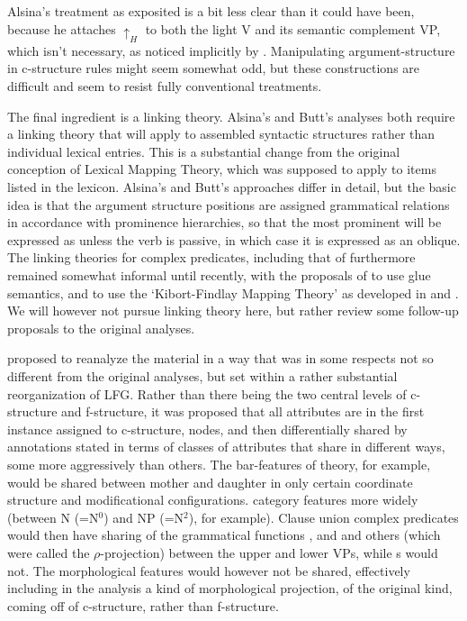 \documentclass[output=paper,hidelinks]{langscibook}
\begin{document}
Alsina’s treatment as exposited is a bit less clear than it could have been, because he attaches $\uparrow_H$ to both the light V and its semantic complement VP, which isn't necessary, as
noticed implicitly by \citet[241]{ButtKing2006}.  Manipulating
argument-structure in c-structure rules might seem somewhat odd, but these constructions
are difficult and seem to resist fully conventional treatments.

The final ingredient is a linking theory.  Alsina's and Butt's analyses both
require a linking theory that will apply to assembled syntactic structures rather
than individual lexical entries.  This is a substantial change from the original
conception of Lexical Mapping Theory, which was supposed to apply to items listed
in the lexicon.  Alsina's and Butt's approaches differ in
detail, but the basic idea is that the argument structure positions are assigned
grammatical relations in accordance with prominence hierarchies, so that the
most prominent will be expressed as {\SUBJ} unless the verb is passive, in which
case it is expressed as an oblique.
The linking theories for complex predicates, including that of
\citet{AndrewsManning1999} furthermore remained somewhat informal until recently,
with the proposals of \citet{Lowe2015} to use glue semantics, and
\citet{Andrews2018shs} to use the `Kibort-Findlay Mapping Theory' as developed in
\citet{asudeh2014meaning} and \citet{findlay2017mapping}.  We will however
not pursue linking theory here, but rather review some follow-up proposals to
the original analyses.

\citet{AndrewsManning1999} proposed to reanalyze the material in a way that was
in some respects not so different from the original analyses, but set within a
rather substantial reorganization of LFG.  Rather than there being the two central
levels of c-structure and f-structure, it was proposed that all attributes are
in the first instance assigned to c-structure, nodes, and then differentially shared
by annotations stated in terms of classes of attributes
that share in different ways, some more aggressively
than others.  The bar-features of  theory, for example, would be shared between mother and daughter in only
certain coordinate structure and modificational configurations. category features more widely
(between N (=N$^0$) and NP (=N$^2$), for example). Clause union complex predicates would then
have sharing of the grammatical functions {\SUBJ}, {\OBJ} and {\OBJTHETA} and others
(which were called the $\rho$-projection) between the upper and lower VPs, while {\XCOMP}s
would not.  The morphological features would however not be shared, effectively including in
the analysis a kind of morphological projection, of the original kind, coming off of c-structure,
rather than f-structure.
\end{document}

